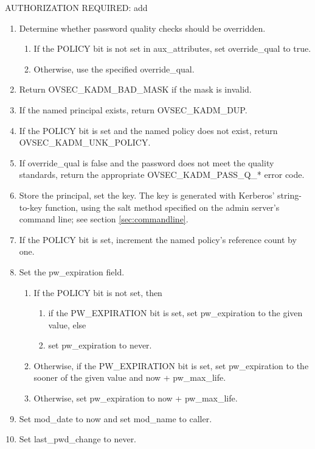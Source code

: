 AUTHORIZATION REQUIRED: add

\begin{enumerate}
\item Determine whether password quality checks should be overridden.
\begin{enumerate}
\item If the POLICY bit is not set in aux_attributes, set
override_qual to true.
\item Otherwise, use the specified override_qual.
\end{enumerate}

\item Return OVSEC_KADM_BAD_MASK if the mask is invalid.
\item If the named principal exists, return OVSEC_KADM_DUP.
\item If the POLICY bit is set and the named policy does not exist,
return OVSEC_KADM_UNK_POLICY.
\item If override_qual is false and the password does not meet the
quality standards, return the appropriate OVSEC_KADM_PASS_Q_* error
code.
\item Store the principal, set the key.  The key is generated with
Kerberos' string-to-key function, using the salt method specified on
the admin server's command line; see section \ref{sec:commandline}.
\item If the POLICY bit is set, increment the named policy's reference
count by one.

\item Set the pw_expiration field.
\begin{enumerate}
\item If the POLICY bit is not set, then
\begin{enumerate}
\item if the PW_EXPIRATION bit is set, set pw_expiration to the given
value, else
\item set pw_expiration to never.
\end{enumerate}
\item Otherwise, if the PW_EXPIRATION bit is set, set pw_expiration to
the sooner of the given value and now + pw_max_life.
\item Otherwise, set pw_expiration to now + pw_max_life.
\end{enumerate}

\item Set mod_date to now and set mod_name to caller.
\item Set last_pwd_change to never.
\end{enumerate}

